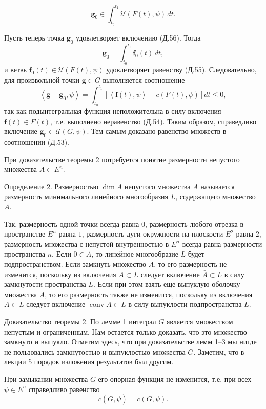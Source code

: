 \documentclass[8pt]{extarticle}
\begin{document}
\[
\mathbf{g}_0 \in \int_{t_0}^{t_1}\mathcal{U}\left( F(t),\psi \right)\,dt. \tag{Д.56}
\]

Пусть теперь точка \(\mathbf{g}_0\) удовлетворяет включению (Д.56). Тогда
\[
\mathbf{g}_0 = \int_{t_0}^{t_1}\mathbf{f}_0(t)\,dt,
\]
и ветвь \(\mathbf{f}_0(t) \in \mathcal{U}\left( F(t),\psi \right)\) удовлетворяет равенству (Д.55). Следовательно, для произвольной точки \(\mathbf{g} \in G\) выполняется соотношение
\[
\left\langle \mathbf{g} - \mathbf{g}_0,\psi \right\rangle
= \int_{t_0}^{t_1}\left[ \left\langle \mathbf{f}(t),\psi \right\rangle - c\left( F(t),\psi \right) \right] dt \leq 0,
\]
так как подынтегральная функция неположительна в силу включения \(\mathbf{f}(t) \in F(t)\), т.е. выполнено неравенство (Д.54). Таким образом, справедливо включение \(\mathbf{g}_0 \in \mathcal{U}\left( G,\psi \right)\). Тем самым доказано равенство множеств в соотношении (Д.53).

При доказательстве теоремы 2 потребуется понятие размерности непустого множества \(A \subset E^n\).

Определение 2. Размерностью \(\dim A\) непустого множества \(A\) называется размерность минимального линейного многообразия \(L\), содержащего множество \(A\).

Так, размерность одной точки всегда равна \(0\), размерность любого отрезка в пространстве \(E^n\) равна \(1\), размерность дуги окружности на плоскости \(E^2\) равна \(2\), размерность множества с непустой внутренностью в \(E^n\) всегда равна размерности пространства \(n\). Если \(0 \in A\), то линейное многообразие \(L\) будет подпространством. Если замкнуть множество \(A\), то его размерность не изменится, поскольку из включения \(A \subset L\) следует включение \(\bar{A} \subset L\) в силу замкнутости пространства \(L\). Если при этом взять еще выпуклую оболочку множества \(A\), то его размерность также не изменится, поскольку из включения \(\bar{A} \subset L\) следует включение \(\operatorname{conv}\bar{A} \subset L\) в силу выпуклости подпространства \(L\).

Доказательство теоремы 2. По лемме 1 интеграл \(G\) является множеством непустым и ограниченным. Нам остается только доказать, что это множество замкнуто и выпукло. Отметим здесь, что при доказательстве лемм 1--3 мы нигде не пользовались замкнутостью и выпуклостью множества \(G\). Заметим, что в лекции 5 порядок изложения результатов был другим.

При замыкании множества \(G\) его опорная функция не изменится, т.е. при всех \(\psi \in E^n\) справедливо равенство
\[
c\left( \bar{G},\psi \right) = c\left( G,\psi \right). \tag{Д.57}
\]
\end{document}
